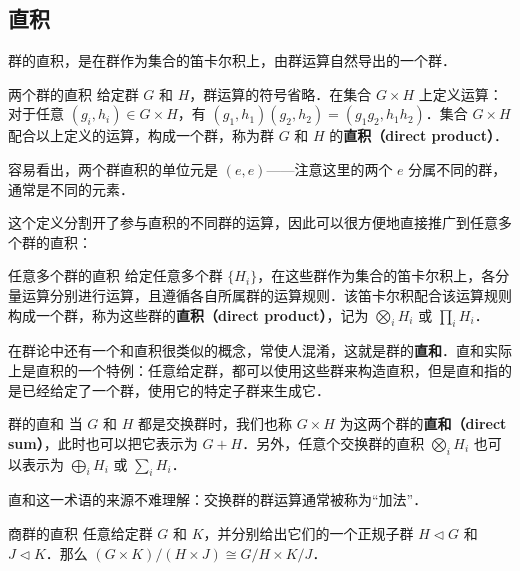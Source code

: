 


\subsection{直积}

群的直积，是在群作为集合的笛卡尔积上，由群运算自然导出的一个群．

\begin{definition}{两个群的直积}
给定群 $G$ 和 $H$，群运算的符号省略．在集合 $G\times H$ 上定义运算：对于任意 $(g_i, h_i)\in G\times H$，有 $(g_1, h_1)(g_2, h_2)=(g_1g_2, h_1h_2)$．集合 $G\times H$ 配合以上定义的运算，构成一个群，称为群 $G$ 和 $H$ 的\textbf{直积（direct product）}．
\end{definition}

容易看出，两个群直积的单位元是 $(e, e)$——注意这里的两个 $e$ 分属不同的群，通常是不同的元素．

这个定义分割开了参与直积的不同群的运算，因此可以很方便地直接推广到任意多个群的直积：

\begin{definition}{任意多个群的直积}
给定任意多个群 $\{H_i\}$，在这些群作为集合的笛卡尔积上，各分量运算分别进行运算，且遵循各自所属群的运算规则．该笛卡尔积配合该运算规则构成一个群，称为这些群的\textbf{直积（direct product）}，记为 $\bigotimes_iH_i$ 或 $\prod_iH_i$．
\end{definition}

在群论中还有一个和直积很类似的概念，常使人混淆，这就是群的\textbf{直和}．直和实际上是直积的一个特例：任意给定群，都可以使用这些群来构造直积，但是直和指的是已经给定了一个群，使用它的特定子群来生成它．

\begin{definition}{群的直和}
当 $G$ 和 $H$ 都是交换群时，我们也称 $G\times H$ 为这两个群的\textbf{直和（direct sum）}，此时也可以把它表示为 $G+H$．另外，任意个交换群的直积 $\bigotimes_iH_i$ 也可以表示为 $\bigoplus_iH_i$ 或 $\sum_iH_i$．
\end{definition}

直和这一术语的来源不难理解：交换群的群运算通常被称为“加法”．

\begin{theorem}{商群的直积}\label{GrpPrd_the1}
任意给定群 $G$ 和 $K$，并分别给出它们的一个正规子群 $H\triangleleft G$ 和 $J\triangleleft K$．那么 $(G\times K)/(H\times J)\cong G/H\times K/J$．
\end{theorem}

